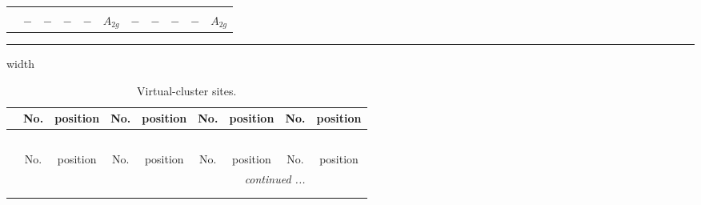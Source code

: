 \documentclass[fleqn,10pt,landscape]{article}
\begin{document}
\begin{itemize}
\begin{center}
\begin{longtable}{ccccccccccc}
 \hline \hline
\multicolumn{10}{r}{} \\ \endlastfoot

$  $ & $ - $ & $ - $ & $ - $ & $ - $ & $ A_{2g} $ & $ - $ & $ - $ & $ - $ & $ - $ & $ A_{2g} $ \\
\end{longtable}
\end{center}

 \hfil \hrule height 1mm width \textwidth \hfil

{
\scriptsize
\begin{center}
\renewcommand{\arraystretch}{1.7}
\begin{longtable}{ccccccccc}
\caption{Virtual-cluster sites.}
 \\
 \hline \hline
 & No. & position & No. & position & No. & position & No. & position \\ \hline \endfirsthead

\multicolumn{8}{l}{\tablename\ \thetable{}} \\
 \hline \hline
 & No. & position & No. & position & No. & position & No. & position \\ \hline \endhead

 \hline \hline
\multicolumn{8}{r}{\footnotesize\it continued ...} \\ \endfoot

 \hline \hline
\multicolumn{8}{r}{} \\ \endlastfoot


\end{longtable}
\end{center}}
\end{itemize}
\end{document}
